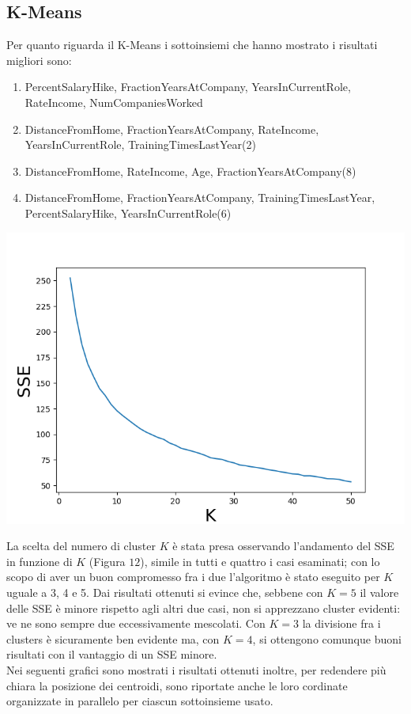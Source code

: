 \documentclass[english]{article}
\begin{document}
\subsection{K-Means}
Per quanto riguarda il K-Means i sottoinsiemi che hanno mostrato i risultati migliori sono:\\

\begin{enumerate}
\item PercentSalaryHike, FractionYearsAtCompany, YearsInCurrentRole, RateIncome, NumCompaniesWorked
\item DistanceFromHome, FractionYearsAtCompany, RateIncome, YearsInCurrentRole, TrainingTimesLastYear(2)
\item DistanceFromHome, RateIncome, Age, FractionYearsAtCompany(8)
\item DistanceFromHome, FractionYearsAtCompany, TrainingTimesLastYear, PercentSalaryHike, YearsInCurrentRole(6)
\end{enumerate}

\begin{center}
\includegraphics[scale=0.6]{SSEsub1.png}
\end{center}

La scelta del numero di cluster $K$ è stata presa osservando l'andamento del SSE in funzione di $K$ (Figura $12$), simile in tutti e quattro i casi esaminati; con lo scopo di aver un buon compromesso fra i due l'algoritmo è stato eseguito per $K$ uguale a 3, 4 e 5. Dai risultati ottenuti si evince che, sebbene con $K=5$ il valore delle SSE è minore rispetto agli altri due casi, non si apprezzano cluster evidenti: ve ne sono sempre due eccessivamente mescolati. Con $K=3$ la divisione fra i clusters è sicuramente ben evidente ma, con $K=4$, si ottengono comunque buoni risultati con il vantaggio di un SSE minore. \\
Nei seguenti grafici sono mostrati i risultati ottenuti inoltre, per redendere più chiara la posizione dei centroidi, sono riportate anche le loro cordinate organizzate in parallelo per ciascun sottoinsieme usato.
\end{document}

